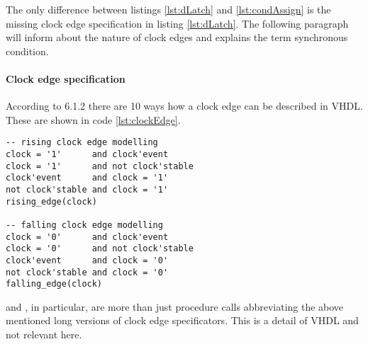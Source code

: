 The only difference between listings \ref{lst:dLatch} and
\ref{lst:condAssign} is the missing clock edge specification in
listing \ref{lst:dLatch}. The following paragraph will inform about
the nature of clock edges and explains the term synchronous condition.

\paragraph{Clock edge specification}
According to \cite{IEEESYNTH} 6.1.2
there are 10 ways how a clock edge can be described in VHDL. These are
shown in code \ref{lst:clockEdge}.
%
\begin{lstlisting}[style=vhdl,caption={Clock edge specification syntax
    in VHDL},label={lst:clockEdge}]
-- rising clock edge modelling
clock = '1'      and clock'event
clock = '1'      and not clock'stable
clock'event      and clock = '1'
not clock'stable and clock = '1'
rising_edge(clock)

-- falling clock edge modelling
clock = '0'      and clock'event
clock = '0'      and not clock'stable
clock'event      and clock = '0'
not clock'stable and clock = '0'
falling_edge(clock)
\end{lstlisting}
%
 and , in particular, are
more than just procedure calls abbreviating the above mentioned long
versions of clock edge specificators. This is a detail of VHDL and not
relevant here.

